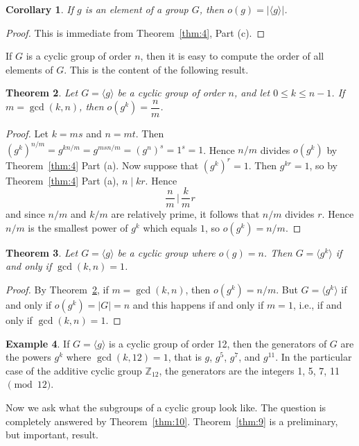 \documentclass[11pt]{article}
\newcommand{\Z} {{\mathbb Z}}
\newcommand{\divides}{\ensuremath{\mid}}
\newcommand{\<}{\ensuremath{\langle}}
\renewcommand{\>}{\ensuremath{\rangle}}
\theoremstyle{plain}
\newtheorem{thm}{Theorem}%
\newtheorem{cor}[thm]{Corollary}
\theoremstyle{definition}
\newtheorem{ex}[thm]{Example}
\begin{document}
\begin{cor}    If $g$ is an element of a group $G$, then
$o(g)=|\langle g\rangle|$.
\end{cor}
\begin{proof}  This is immediate from Theorem~\ref{thm:4}, Part (c).
\end{proof}

If $G$ is a cyclic group  of order $n$,  then it is easy to
compute the order of all elements of $G$.  This is the content of
the following result.

\begin{thm}
\label{thm:6}
  Let $G=\langle g\rangle $ be a cyclic
group of order $n$, and let $0\le k\le n-1$.  If $m=\gcd (k, n)$,
then $o(g^k)=\dfrac{n}{m}$.
\end{thm}

\begin{proof}  Let $k=ms$ and $n=mt$.  Then
$(g^k)^{n/m}=g^{kn/m}=g^{msn/m}=(g^n)^s=1^s=1$.  Hence $n/m$
divides $o(g^k)$ by Theorem~\ref{thm:4} Part (a).  Now suppose that
$(g^k)^r=1$.  Then $g^{kr} = 1$, so by Theorem~\ref{thm:4} Part (a), $n\divides
kr$. Hence $$\frac{n}{ m}\,\Big|\,\frac{k}{ m} r$$ and since $n/m$
and $k/m$ are relatively prime, it follows that $n/m$ divides $r$.
Hence $n/m$ is the smallest power of $g^k$ which equals $1$, so
$o(g^k)=n/m$.
\end{proof}

\begin{thm}  Let $G=\langle g\rangle$ be a cyclic group where
$o(g)=n$. Then $G=\langle g^k\rangle $ if and only if $\gcd (k, n)
= 1$.
\end{thm}

\begin{proof}  By Theorem~\ref{thm:6},  if $m=\gcd (k, n)$, then $o(g^k)=n/m$.  But
$G=\langle g^k\rangle $ if and only if $o(g^k)=|G|=n$ and this
happens if and only if $m=1$, i.e., if and only if $\gcd(k, n)=1$.
\end{proof}

\begin{ex}
  If $G=\langle g\rangle$ is a cyclic group of order 12, then
the generators of $G$ are the powers $g^k$ where $\gcd (k, 12) =
1$, that is $g$, $g^5$, $g^7$, and $g^{11}$.  In the particular
case of the additive cyclic group $\Z_{12}$, the generators are
the integers 1, 5, 7, 11 $\pmod{12}$.
\end{ex}
Now we ask what the subgroups of a  cyclic group look like.  The
question is completely answered by Theorem~\ref{thm:10}.  
Theorem~\ref{thm:9} is a preliminary, but important, result.
\end{document}
